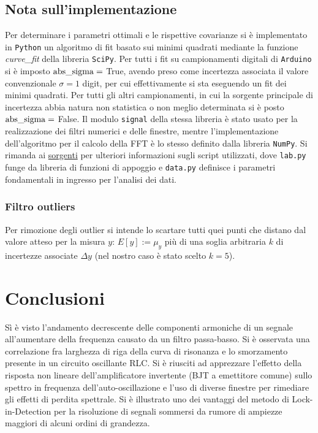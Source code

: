 \documentclass{article}[a4paper, oneside, 11pt]
\begin{document}
\subsection{Nota sull'implementazione}
Per determinare i parametri ottimali e le rispettive covarianze si \`e
implementato in \verb+Python+ un algoritmo di fit basato sui minimi quadrati
mediante la funzione \emph{curve\_fit} della libreria 
\texttt{SciPy}\cite{scipy}.
Per tutti i fit su campionamenti digitali di \verb+Arduino+ si \`e imposto
$\rm{abs\_sigma} =$ True, avendo preso come incertezza associata il valore
convenzionale $\sigma = 1$ digit, per cui effettivamente si sta eseguendo
un fit dei minimi quadrati. Per tutti gli altri campionamenti, in cui la
sorgente principale di incertezza abbia natura non statistica o non meglio
determinata si è posto $\rm{abs\_sigma} =$ False. 
Il modulo \texttt{signal} della stessa libreria è stato usato per
la realizzazione dei filtri numerici e delle finestre, mentre
l'implementazione dell'algoritmo per il calcolo della FFT è lo stesso
definito dalla libreria \texttt{NumPy}\cite{numpy}.
Si rimanda ai
\href{https://github.com/BernardoTomelleri/FFT/tree/master}{sorgenti}
per ulteriori informazioni sugli script utilizzati, dove \verb+lab.py+ funge
da libreria di funzioni di appoggio e \verb+data.py+ definisce i parametri
fondamentali in ingresso per l'analisi dei dati.
\subsubsection{Filtro outliers}
Per rimozione degli outlier si intende lo scartare tutti quei punti che
distano dal valore atteso per la misura $y$: $E[y] := \mu_y$ pi\`u di una
soglia arbitraria $k$ di incertezze associate $\Delta y$
(nel nostro caso \`e stato scelto $k = 5$).

\section{Conclusioni}
Sì è visto l'andamento decrescente delle componenti armoniche di un segnale
all'aumentare della frequenza causato da un filtro passa-basso.
Si è osservata una correlazione fra larghezza di riga della curva di risonanza
e lo smorzamento presente in un circuito oscillante RLC.
Si è riusciti ad apprezzare l'effetto della risposta non lineare
dell'amplificatore invertente (BJT a emettitore comune) sullo spettro
in frequenza dell'auto-oscillazione e l'uso di diverse finestre per
rimediare gli effetti di perdita spettrale.
Si è illustrato uno dei vantaggi del metodo di Lock-in-Detection per 
la risoluzione di segnali sommersi da rumore di ampiezze maggiori di alcuni
ordini di grandezza.

\medskip


\end{document}
